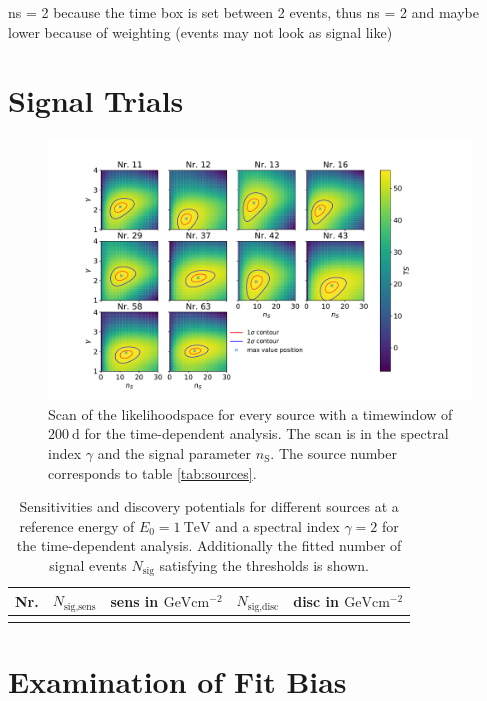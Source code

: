 ns = 2 because the time box is set between 2 events, thus ns = 2 and maybe lower because of weighting (events may not look as signal like)
\section{Signal Trials}

\begin{figure}
    \centering
    \includegraphics[width=\linewidth]{Plots/05_csky/llh_scan.pdf}
    \caption{Scan of the likelihoodspace for every source with a timewindow of $\SI{200}{\day}$ for the time-dependent analysis. The scan is in the spectral index $\gamma$ and the signal parameter $n_\text{S}$. The source number corresponds to table \ref{tab:sources}.}
    \label{fig:llh_scan_time_dep}
\end{figure}

\begin{table}
  \centering
  \caption{Sensitivities and discovery potentials for different sources at a reference energy of $E_0 = \SI{1}{\tera\electronvolt}$ and a spectral index $\gamma=2$ for the time-dependent analysis. Additionally the fitted number of signal events $N_\text{sig}$ satisfying the thresholds is shown.}
  \begin{tabular}{crcrc}
    \toprule
    Nr. & $N_\text{sig,sens}$ &  sens in $\si{\giga\electronvolt\centi\meter\tothe{-2}}$ & $N_\text{sig,disc}$ & disc in $\si{\giga\electronvolt\centi\meter\tothe{-2}}$ \\
    \toprule
      
    \toprule
    \label{tab:sens_disc_time_dep}
  \end{tabular}
\end{table}

\section{Examination of Fit Bias}

